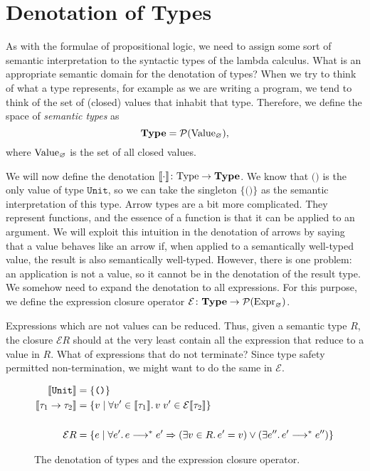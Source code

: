 \section{Denotation of Types}

As with the formulae of propositional logic, we need to assign some sort of
semantic interpretation to the syntactic types of the lambda calculus. What is
an appropriate semantic domain for the denotation of types? When we try to
think of what a type represents, for example as we are writing a program, we
tend to think of the set of (closed) values that inhabit that type. Therefore,
we define the space of \emph{semantic types} as
\[
  \textbf{Type} = \mathcal{P}(\mathrm{Value}_{\varnothing}),
\]
where $\mathrm{Value}_{\varnothing}$ is the set of all closed values.

We will now define the denotation
$\llbracket\cdot\rrbracket \colon \mathrm{Type} \to \textbf{Type}$.
We know that $\texttt{()}$ is the only value of type $\texttt{Unit}$,
so we can take the singleton $\{\texttt{()}\}$ as the semantic
interpretation of this type.
Arrow types are a bit more complicated. They represent functions, and the
essence of a function is that it can be applied to an argument. We will exploit
this intuition in the denotation of arrows by saying that a value behaves like
an arrow if, when applied to a semantically well-typed value, the result is
also semantically well-typed. However, there is one problem: an application is
not a value, so it cannot be in the denotation of the result type.
We somehow need to expand the denotation to all expressions.
For this purpose, we define the expression closure operator
$\mathcal{E} \colon \textbf{Type} \to
  \mathcal{P}(\mathrm{Expr}_{\varnothing})$.

Expressions which are not values can be reduced.
Thus, given a semantic type $R$, the closure $\mathcal{E} R$
should at the very least contain all the expression that reduce
to a value in $R$. What of expressions that do not terminate? Since
type safety permitted non-termination, we might want to do the same in
$\mathcal{E}$.

\begin{figure}[t!!]
\begin{alignat*}{2}
  \llbracket\texttt{Unit}\rrbracket & = \{\texttt{()}\} \\
  \llbracket\tau_1 \to \tau_2\rrbracket & = \{ v \mid
    \forall v' \in \llbracket\tau_1\rrbracket\ldotp v\;v' \in \mathcal{E}\llbracket\tau_2\rrbracket \} \\\\
  \mathcal{E}R & = \{ e \mid \forall e'\ldotp e \longrightarrow^* e'
  \Rightarrow (\exists v \in R \ldotp e'=v) \lor
    (\exists e'' \ldotp e'\longrightarrow^*e'') \}
\end{alignat*}
\caption{The denotation of types and the expression closure operator.}
\label{fig:logicalRelations_denots}
\end{figure}

